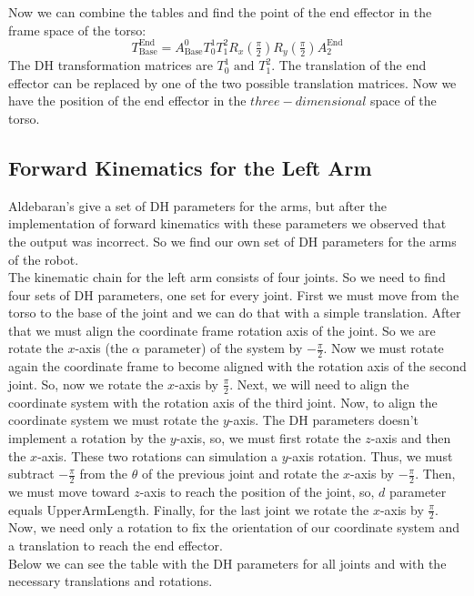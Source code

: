 Now we can combine the tables and find the point of the end effector in the frame space of the torso:
\[
T^\text{End}_\text{Base} = A^0_\text{Base}T^1_0T^2_1R_x(\tfrac{\pi}{2})R_y(\tfrac{\pi}{2})A^\text{End}_{2}
\]
The DH transformation matrices are \(T^1_0\text{ and }T^2_1\). The translation of the end effector can be replaced by one of the two possible translation matrices. Now we have the position of the end effector in the \(three-dimensional\) space of the torso.

\subsection{Forward Kinematics for the Left Arm}
Aldebaran's give a set of DH parameters for the arms, but after the implementation of forward kinematics with these parameters we observed that the output was incorrect. So we find our own set of DH parameters for the arms of the robot.\\
The kinematic chain for the left arm consists of four joints. So we need to find four sets of DH parameters, one set for every joint. First we must move from the torso to the base of the joint and we can do that with a simple translation. After that we must align the coordinate frame rotation axis of the joint. So we are rotate the \(x\)-axis (the $\alpha$ parameter) of the system by \(-\frac{\pi}{2}\). Now we must rotate again the coordinate frame to become aligned with the rotation axis of the second joint. So, now we rotate the \(x\)-axis by \(\frac{\pi}{2}\). Next, we will need to align the coordinate system with the rotation axis of the third joint. Now, to align the coordinate system we must rotate the \(y\)-axis. The DH parameters doesn't implement a rotation by the \(y\)-axis, so, we must first rotate the \(z\)-axis and then the \(x\)-axis. These two rotations can simulation a \(y\)-axis rotation. Thus, we must subtract \(-\frac{\pi}{2}\) from the \(\theta\) of the previous joint and rotate the \(x\)-axis by \(-\frac{\pi}{2}\). Then, we must move toward \(z\)-axis to reach the position of the joint, so, \(d\) parameter equals UpperArmLength. Finally, for the last joint we rotate the \(x\)-axis by \(\frac{\pi}{2}\). Now, we need only a rotation to fix the orientation of our coordinate system and a translation to reach the end effector.\\
Below we can see the table with the DH parameters for all joints and with the necessary translations and rotations.
